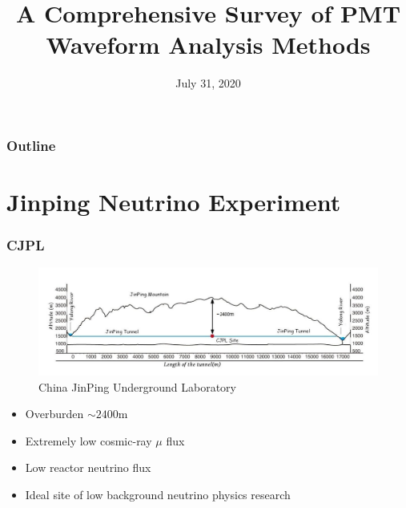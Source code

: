 \documentclass[handout]{beamer}
\title[Waveform Analysis]{A Comprehensive Survey of PMT Waveform Analysis Methods}
\date[DANCE]{July 31, 2020}
\begin{document}
\frame{\titlepage}

\begin{frame}
\frametitle{Outline}
\tableofcontents
\end{frame}

\section{Jinping Neutrino Experiment}
\begin{frame}
\frametitle{CJPL}
\begin{figure}
    \centering
    \caption{China JinPing Underground Laboratory}
    \includegraphics[width=1.0\linewidth]{img/mountain.png}
\end{figure}
\begin{itemize}
    \item Overburden $\sim2400\mathrm{m}$
    \item Extremely low cosmic-ray $\mu$ flux
    \item Low reactor neutrino flux
    \item Ideal site of low background neutrino physics research
\end{itemize}
\end{frame}
\end{document}
